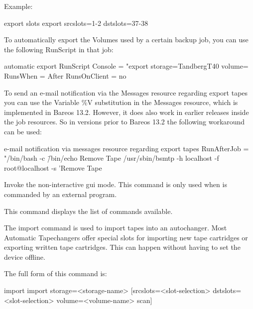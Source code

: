\begin{description}
   Example:

\begin{bconsole}{export slots}
export srcslots=1-2 dstslots=37-38
\end{bconsole}

   To automatically export the Volumes used by a certain backup job, you can use the following RunScript in that job:

\begin{bconsole}{automatic export}
RunScript {
    Console = "export storage=TandbergT40 volume=%
    RunsWhen = After
    RunsOnClient = no
}
\end{bconsole}

  To send an e-mail notification via the Messages resource regarding export tapes you can use the Variable \%V substitution in the Messages resource, which is implemented in Bareos 13.2. However, it does also work in earlier releases inside the job resources. So in versions prior to Bareos 13.2 the following workaround can be used:

\begin{bconsole}{e-mail notification via messages resource regarding export tapes}
RunAfterJob = "/bin/bash -c \"/bin/echo Remove Tape %
/usr/sbin/bsmtp -h localhost -f root@localhost -s 'Remove Tape %
\end{bconsole}


\item [gui]
    Invoke the non-interactive gui mode.
    This command is only used when  is commanded by an external program.

\item [help]
   This command displays the list of commands available.

\item [import]
   The import command is used to import tapes into an autochanger. Most Automatic
   Tapechangers offer special slots for importing new tape cartridges or
   exporting written tape cartridges. This can happen without having to set
   the device offline.

   The full form of this command is:

\begin{bconsole}{import}
import storage=<storage-name> [srcslots=<slot-selection> dstslots=<slot-selection> volume=<volume-name> scan]
\end{bconsole}


\end{description}
